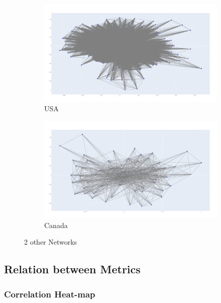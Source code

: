 \begin{figure}[H]
     \centering
     \begin{subfigure}[b]{0.48\textwidth}
         \includegraphics[width=\textwidth]{images/networks/graph-USA.png}
         \caption{USA}
         \label{fig:USA}
     \end{subfigure}
     \hfill
     \begin{subfigure}[b]{0.48\textwidth}
         \includegraphics[width=\textwidth]{images/networks/graph-CANADA.png}
         \caption{Canada}
         \label{fig:CANADA}
     \end{subfigure}
        \caption{2 other Networks}
        \label{fig:two other networks}
\end{figure}

\subsection{Relation between Metrics}

\subsubsection{Correlation Heat-map}

